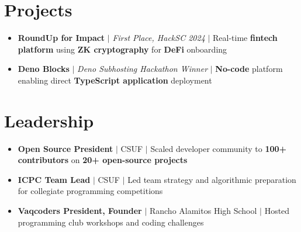 \documentclass[letterpaper,11pt]{article}
\newcommand{\resumeItem}[1]{
  \item\small{
    {#1 \vspace{-2pt}}
  }
}
\newcommand{\resumeSubHeadingListStart}{\begin{itemize}[leftmargin=0.15in, label={}]}
\newcommand{\resumeSubHeadingListEnd}{\end{itemize}}
\begin{document}
\section{Projects}
\resumeSubHeadingListStart
  \resumeItem{\textbf{RoundUp for Impact} $|$ \emph{First Place, HackSC 2024} $|$ Real-time \textbf{fintech platform} using \textbf{ZK cryptography} for \textbf{DeFi} onboarding}
  \resumeItem{\textbf{Deno Blocks} $|$ \emph{Deno Subhosting Hackathon Winner} $|$ \textbf{No-code} platform enabling direct \textbf{TypeScript application} deployment}
\resumeSubHeadingListEnd

\section{Leadership}
\resumeSubHeadingListStart
  \resumeItem{\textbf{Open Source President} $|$ CSUF $|$ Scaled developer community to \textbf{100+ contributors} on \textbf{20+ open-source projects}}
  \resumeItem{\textbf{ICPC Team Lead} $|$ CSUF $|$ Led team strategy and algorithmic preparation for collegiate programming competitions}
  \resumeItem{\textbf{Vaqcoders President, Founder} $|$ Rancho Alamitos High School $|$ Hosted programming club workshops and coding challenges}
\resumeSubHeadingListEnd

\end{document}
